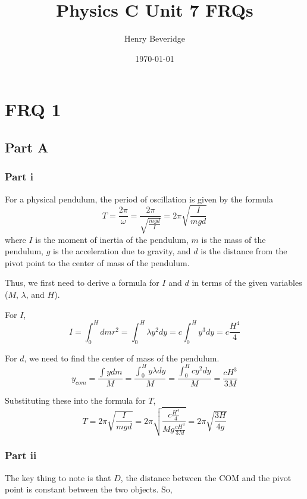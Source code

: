 \documentclass{article}
\title{Physics C Unit 7 FRQs}
\author{Henry Beveridge}
\date{\today}
\begin{document}
\maketitle

\pagebreak

\section{FRQ 1}

\subsection{Part A}

\subsubsection{Part i}

For a physical pendulum, the period of oscillation is given by the formula
$$
T = \frac{2\pi}{\omega} = \frac{2\pi}{\sqrt{\frac{mgd}{I}}} = 2\pi\sqrt{\frac{I}{mgd}}
$$
where $I$ is the moment of inertia of the pendulum, $m$ is the mass of the pendulum, $g$ is the acceleration due to gravity, and $d$ is the distance from the pivot point to the center of mass of the pendulum.

Thus, we first need to derive a formula for $I$ and $d$ in terms of the given variables ($M$, $\lambda$, and $H$).

For $I$,
$$
I = \int_0^H dm r^2 = \int_0^H \lambda y^2 dy = c \int_0^H y^3 dy = c \frac{H^4}{4}
$$


For $d$, we need to find the center of mass of the pendulum.
$$
y_{com} = \frac{\int y dm}{M} = \frac{\int_0^H y \lambda dy}{M} = \frac{\int_0^H cy^2 dy}{M} = \frac{cH^3}{3M}
$$

Substituting these into the formula for $T$,
$$
T = 2\pi\sqrt{\frac{I}{mgd}} = 2\pi\sqrt{\frac{c\frac{H^4}{4}}{Mg\frac{cH^3}{3M}}} = 2\pi\sqrt{\frac{3H}{4g}}
$$


\subsubsection{Part ii}

%
The key thing to note is that $D$, the distance between the COM and the pivot point is constant between the two objects. So,
\end{document}
